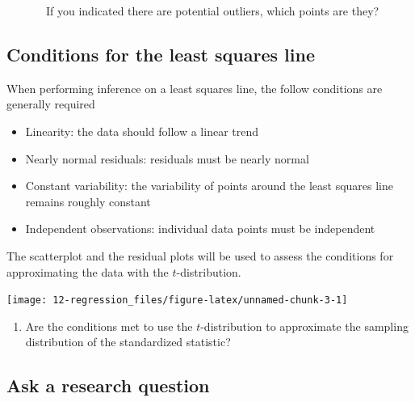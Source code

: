 \documentclass[
]{report}
\providecommand{\tightlist}{%
  \setlength{\itemsep}{0pt}\setlength{\parskip}{0pt}}
\begin{document}
~~~~~~~If you indicated there are potential outliers, which points are they?

\vspace{0.5in}

\hypertarget{conditions-for-the-least-squares-line}{%
\subsection*{Conditions for the least squares line}\label{conditions-for-the-least-squares-line}}

When performing inference on a least squares line, the follow conditions are generally required

\begin{itemize}
\item
  Linearity: the data should follow a linear trend
\item
  Nearly normal residuals: residuals must be nearly normal
\item
  Constant variability: the variability of points around the least squares line remains roughly constant
\item
  Independent observations: individual data points must be independent
\end{itemize}

The scatterplot and the residual plots will be used to assess the conditions for approximating the data with the \(t\)-distribution.

\begin{center}\texttt{[image: 12-regression\_files/figure-latex/unnamed-chunk-3-1]} \end{center}

\begin{enumerate}
\def\labelenumi{\arabic{enumi}.}
\setcounter{enumi}{4}
\tightlist
\item
  Are the conditions met to use the \(t\)-distribution to approximate the sampling distribution of the standardized statistic?
\end{enumerate}

\vspace{1.5in}

\hypertarget{ask-a-research-question}{%
\subsection*{Ask a research question}\label{ask-a-research-question}}
\end{document}
